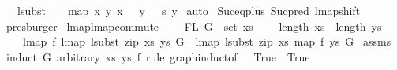 \begin{isabellebody}
\ \ \ lsubst\ {\isacharparenleft}{\kern0pt}{\isacharparenleft}{\kern0pt}{}{\isacharcomma}{\kern0pt}\ {}{\isacharparenright}{\kern0pt}\ {\isacharhash}{\kern0pt}\ map\ {\isacharparenleft}{\kern0pt}{\isasymlambda}{\isacharparenleft}{\kern0pt}x{\isacharcomma}{\kern0pt}\ y{\isacharparenright}{\kern0pt}{\isachardot}{\kern0pt}\ {\isacharparenleft}{\kern0pt}x\ {\isacharplus}{\kern0pt}\ {}{\isacharcomma}{\kern0pt}\ y\ {\isacharplus}{\kern0pt}\ {}{\isacharparenright}{\kern0pt}{\isacharparenright}{\kern0pt}\ s{\isacharparenright}{\kern0pt}\ y{\isachardoublequoteclose}\isanewline
%
\isadelimproof
%
\endisadelimproof
%
\isatagproof
{}\isamarkupfalse%
\ auto\isanewline
{}\isamarkupfalse%
\ Suc{\isacharunderscore}{\kern0pt}eq{\isacharunderscore}{\kern0pt}plus{}\ Suc{\isacharunderscore}{\kern0pt}pred\ lmap{\isacharunderscore}{\kern0pt}shift\ \isamarkupfalse%
\ presburger%
\endisatagproof
{\isafoldproof}%
%
\isadelimproof
\isanewline
%
\endisadelimproof
\isanewline
\isanewline
\isanewline
{}\isamarkupfalse%
\ lmap{\isacharunderscore}{\kern0pt}lmap{\isacharunderscore}{\kern0pt}commute{\isacharcolon}{\kern0pt}\isanewline
\ \ \ \ {\isachardoublequoteopen}FL\ G\ {\isasymsubseteq}\ set\ xs{\isachardoublequoteclose}\isanewline
\ \ \ \ {\isachardoublequoteopen}length\ xs\ {\isacharequal}{\kern0pt}\ length\ ys{\isachardoublequoteclose}\isanewline
\ \ \ \ {\isachardoublequoteopen}lmap\ f\ {\isacharparenleft}{\kern0pt}lmap\ {\isacharparenleft}{\kern0pt}lsubst\ {\isacharparenleft}{\kern0pt}zip\ xs\ ys{\isacharparenright}{\kern0pt}{\isacharparenright}{\kern0pt}\ G{\isacharparenright}{\kern0pt}\ {\isacharequal}{\kern0pt}\ lmap\ {\isacharparenleft}{\kern0pt}lsubst\ {\isacharparenleft}{\kern0pt}zip\ xs\ {\isacharparenleft}{\kern0pt}map\ f\ ys{\isacharparenright}{\kern0pt}{\isacharparenright}{\kern0pt}{\isacharparenright}{\kern0pt}\ G{\isachardoublequoteclose}\isanewline
%
\isadelimproof
%
\endisadelimproof
%
\isatagproof
{}\isamarkupfalse%
\ assms\isanewline
{}\isamarkupfalse%
\ {\isacharparenleft}{\kern0pt}induct\ G\ arbitrary{\isacharcolon}{\kern0pt}\ xs\ ys\ f\ rule{\isacharcolon}{\kern0pt}\ graph{\isachardot}{\kern0pt}induct{\isacharbrackleft}{\kern0pt}of\ {\isacharunderscore}{\kern0pt}\ {\isachardoublequoteopen}{\isacharpercent}{\kern0pt}{\isacharunderscore}{\kern0pt}{\isachardot}{\kern0pt}\ True{\isachardoublequoteclose}\ {\isachardoublequoteopen}{\isacharpercent}{\kern0pt}{\isacharunderscore}{\kern0pt}{\isachardot}{\kern0pt}\ True{\isachardoublequoteclose}{\isacharbrackright}{\kern0pt}{\isacharparenright}{\kern0pt}\isanewline

\end{isabellebody}
